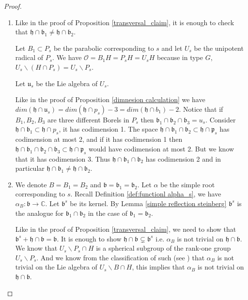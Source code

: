 \documentclass[12pt]{article}
\newcommand{\C}{\mathbb{C}}
\newcommand{\s}{\mathcal{O}}
\theoremstyle{plain}
\theoremstyle{definition}
\begin{document}
\begin{proof}
    \begin{enumerate}
        \item Like in the proof of Proposition \ref{transversal_claim}, it is enough to check that     $ \mathfrak{h} \cap \mathfrak{b}_{1} \neq \mathfrak{h} \cap\mathfrak{b}_{2}$.

    Let $B_1\subset P_s$ be the parabolic corresponding to $s$ and let $U_s$ be the unipotent radical of $P_s$. We have $\s=B_1H=P_sH=U_sH$ because in type $G$, $U_s\backslash(H\cap P_s)=U_s\backslash P_s$.

    Let $\mathfrak{u}_s$ be the Lie algebra of $U_s$.
    
    Like in the proof of Proposition \ref{dimnesion calculation} we have $dim(\mathfrak{h}\cap \mathfrak{u}_s)=dim(\mathfrak{h}\cap p_s)-3=dim(\mathfrak{h}\cap b_1)-2$. Notice that if $B_1,B_2,B_3$ are three different Borels in $P_s$ then $\mathfrak{b}_1\cap \mathfrak{b}_2\cap \mathfrak{b}_3=u_s$. Consider $\mathfrak{h}\cap \mathfrak{b}_1\subset \mathfrak{h}\cap p_s$, it has codimension 1. The space  $\mathfrak{h}\cap \mathfrak{b}_1\cap \mathfrak{b}_2\subset \mathfrak{h}\cap \mathfrak{p}_s$ has codimension at most 2, and if  it has codimension 1 then $\mathfrak{h}\cap \mathfrak{b}_1\cap \mathfrak{b}_2\cap \mathfrak{b}_3\subset \mathfrak{h}\cap \mathfrak{p}_s$ would have codimension at most 2. But we know that it has codimension 3. Thus  $\mathfrak{h}\cap \mathfrak{b}_1\cap\mathfrak{b}_2$ has codimension 2 and in particular $\mathfrak{h}\cap \mathfrak{b}_1\neq \mathfrak{h}\cap\mathfrak{b}_2$.

    \item  We denote $B=B_1=B_2$ and $\mathfrak{b}=\mathfrak{b}_1=\mathfrak{b}_2$. Let $\alpha$ be the simple root corresponding to $s$. Recall Definition \ref{def:functionl alpha_s}, we have $\alpha_B:\mathfrak{b}\rightarrow \C$. Let $\mathfrak{b}^s$ be its kernel. By Lemma \ref{simple reflection steinberg} $\mathfrak{b}^s$ is the analogue for $\mathfrak{b}_1\cap \mathfrak{b}_2$ in the case of $\mathfrak{b}_1= \mathfrak{b}_2$. 

    Like in the proof of Proposition \ref{transversal_claim}, we need to show that $\mathfrak{b}^s+\mathfrak{h}\cap\mathfrak{b}=\mathfrak{b}$. It is enough to show $\mathfrak{h}\cap\mathfrak{b}\subsetneq \mathfrak{b}^s$ i.e. $\alpha_B$ is not trivial on $\mathfrak{h}\cap\mathfrak{b}$. We know that $U_s\backslash P_s\cap H$ is a spherical subgroup of the rank-one group $U_s\backslash P_s$. And we know from the classification of such (see \cite{knop}) that $\alpha_B$ is not trivial on the Lie algebra of $U_s\backslash B\cap H$, this implies that $\alpha_B$ is not trivial on $\mathfrak{h}\cap\mathfrak{b}$.   
        
    \end{enumerate}
\end{proof}
\end{document}
